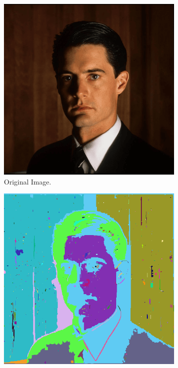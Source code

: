 \documentclass{sbc2023}
\begin{document}
    \begin{figure}[H]
    \centering
        \begin{subfigure}[b]{0.15\textwidth}
            \includegraphics[width=\textwidth]{imgs/cooper.png}
            \caption{Original Image.}
            \label{fig:cooper_original}
        \end{subfigure}
    \hfill
        \begin{subfigure}[b]{0.14\textwidth}
            \includegraphics[width=\textwidth]{imgs/Cooper_felzenszwalb.png}

\end{subfigure}
\end{figure}
\end{document}
